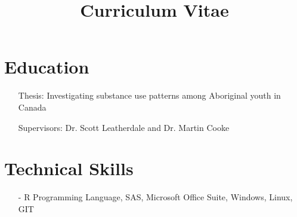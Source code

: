 \documentclass[11pt,a4paper,sans]{moderncv2}        %
\title{Curriculum Vitae}                               %
\begin{document}

\newpage
\makecvtitle
\vspace*{-10mm}

\section{Education}
\vspace{5pt}
\vspace{4pt}
\begin{itemize}
\item[] Thesis: Investigating substance use patterns among Aboriginal youth in Canada
\item[] Supervisors: Dr. Scott Leatherdale and Dr. Martin Cooke
 \end{itemize}
 
\section{Technical Skills}
\begin{itemize}
\item[-] R Programming Language, SAS, Microsoft Office Suite, Windows, Linux, GIT 
\end{itemize}
 
\end{document}
